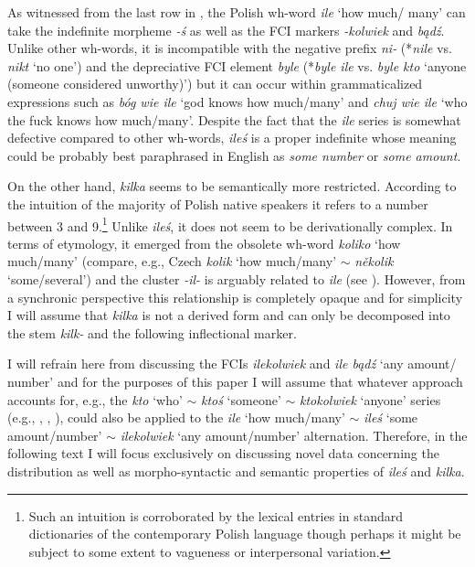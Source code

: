 \documentclass[output=paper,
]{langscibook}
\begin{document}
	As witnessed from the last row in , the Polish wh-word \textit{ile} `how much/ many' can take the indefinite morpheme \textit{-ś} as well as the FCI markers \textit{-kolwiek} and \textit{bądź}. Unlike other wh-words, it is incompatible with the negative prefix \textit{ni-} (*\textit{nile} vs. \textit{nikt} `no one') and the depreciative FCI element \textit{byle} (*\textit{byle ile} vs. \textit{byle kto} `anyone (someone considered unworthy)') but it can occur within grammaticalized expressions such as \textit{bóg wie ile} `god knows how much/many' and \textit{chuj wie ile} `who the fuck knows how much/many'. Despite the fact that the \textit{ile} series is somewhat defective compared to other wh-words, \textit{ileś} is a proper indefinite whose meaning could be probably best paraphrased in English as \textit{some number} or \textit{some amount}.
	
	On the other hand, \textit{kilka} seems to be semantically more restricted. According to the intuition of the majority of Polish native speakers it refers to a number between 3 and 9.\footnote{Such an intuition is corroborated by the lexical entries in standard dictionaries of the contemporary Polish language though perhaps it might be subject to some extent to vagueness or interpersonal variation.} Unlike \textit{ileś}, it does not seem to be derivationally complex. In terms of etymology, it emerged from the obsolete wh-word \textit{koliko} `how much/many' (compare, e.g., Czech \textit{kolik} `how much/many' $\sim$ \textit{několik} `some/several') and the cluster \textit{-il-} is arguably related to \textit{ile} (see \citealt{bankowski2000etymologiczny}). However, from a synchronic perspective this relationship is completely opaque and for simplicity I will assume that \textit{kilka} is not a derived form and can only be decomposed into the stem \textit{kilk-} and the following inflectional marker.
	
	I will refrain here from discussing the FCIs \textit{ilekolwiek} and \textit{ile bądź} `any amount/ number' and for the purposes of this paper I will assume that whatever approach accounts for, e.g., the \textit{kto} `who' $\sim$ \textit{ktoś} `someone' $\sim$ \textit{ktokolwiek} `anyone' series (e.g., \citealt{kadmon_landman1993any}, \citealt{aloni2007free}, \citealt{chierchia2013logic}), could also be applied to the \textit{ile} `how much/many' $\sim$ \textit{ileś} `some amount/number' $\sim$ \textit{ilekolwiek} `any amount/number' alternation. Therefore, in the following text I will focus exclusively on discussing novel data concerning the distribution as well as morpho-syntactic and semantic properties of \textit{ileś} and \textit{kilka}. 
	
\end{document}
